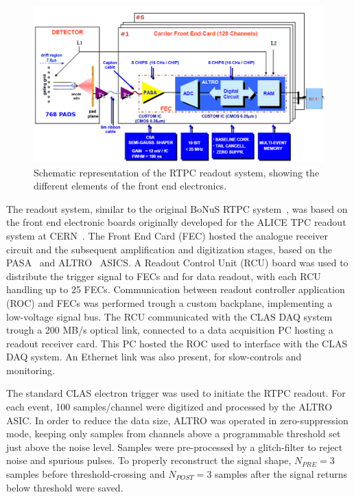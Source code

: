 \documentclass[preprint,5p]{elsarticle}
\begin{document}
\begin{figure}[tb]
   \centering
   \includegraphics[width=.75\textwidth]{ReadoutScheme.png}
   \caption[]{Schematic representation of the RTPC readout system, showing
   the different elements of the front end electronics.} 
   \label{fig:ReadoutScheme}
\end{figure}

The readout system, similar to the original BoNuS RTPC system~\cite{Fenker:2008zz}, 
was based on the front end electronic boards originally developed for the ALICE 
TPC readout system at CERN~\cite{ALICE-FEE}. The Front End Card (FEC) hosted 
the analogue receiver circuit and the subsequent amplification and digitization 
stages, based on the PASA~\cite{Soltveit:2012jp} and 
ALTRO~\cite{EsteveBosch:2003bj} ASICS. A Readout Control Unit (RCU) board was 
used to distribute the trigger signal to FECs and for data readout, with each 
RCU handling up to 25 FECs. Communication between readout controller 
application (ROC) and FECs was performed trough a custom backplane, 
implementing a low-voltage signal bus. The RCU communicated with the CLAS DAQ 
system trough a 200 MB/s optical link, connected to a data acquisition PC 
hosting a readout receiver card. This PC hosted the ROC used to interface with 
the CLAS DAQ system. An Ethernet link was also present, for slow-controls and 
monitoring.

The standard CLAS electron trigger was used to initiate the RTPC readout. For each 
event, 100 samples/channel were digitized and processed by the ALTRO ASIC. In order 
to reduce the data size, ALTRO was operated in zero-suppression mode, keeping only 
samples from channels above a programmable threshold set just above the noise level. 
Samples were pre-processed 
by a glitch-filter to reject noise and spurious pulses. To properly reconstruct the 
signal shape, $N_{PRE}=3$ samples before threshold-crossing and $N_{POST}=3$ samples 
after the signal returns below threshold were saved.
\end{document}
